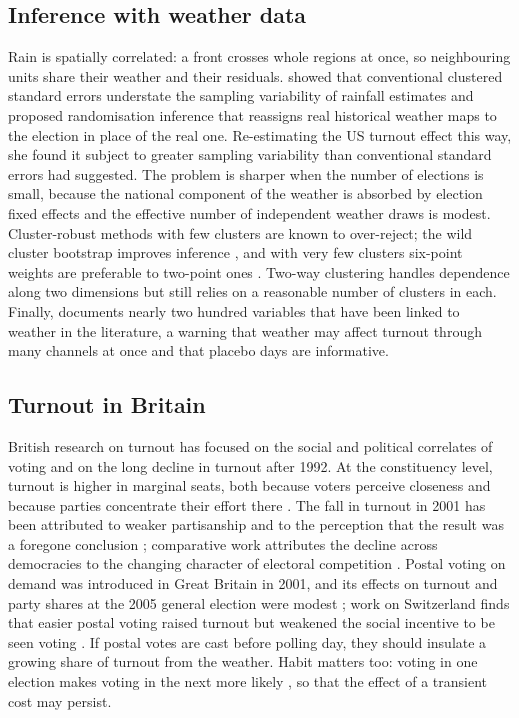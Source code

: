 \documentclass[11pt,a4paper]{article}
\begin{document}
\subsection{Inference with weather data}
Rain is spatially correlated: a front crosses whole regions at once, so neighbouring units share their weather and their residuals. \citet{cooperman2017} showed that conventional clustered standard errors understate the sampling variability of rainfall estimates and proposed randomisation inference that reassigns real historical weather maps to the election in place of the real one. Re-estimating the US turnout effect this way, she found it subject to greater sampling variability than conventional standard errors had suggested. The problem is sharper when the number of elections is small, because the national component of the weather is absorbed by election fixed effects and the effective number of independent weather draws is modest. Cluster-robust methods with few clusters are known to over-reject; the wild cluster bootstrap improves inference \citep{cameron2008}, and with very few clusters six-point weights are preferable to two-point ones \citep{webb2023}. Two-way clustering \citep{cameron2011} handles dependence along two dimensions but still relies on a reasonable number of clusters in each. Finally, \citet{mellon2025} documents nearly two hundred variables that have been linked to weather in the literature, a warning that weather may affect turnout through many channels at once and that placebo days are informative.

\subsection{Turnout in Britain}
British research on turnout has focused on the social and political correlates of voting and on the long decline in turnout after 1992. At the constituency level, turnout is higher in marginal seats, both because voters perceive closeness and because parties concentrate their effort there \citep{denverhands1974,denverhands1985}. The fall in turnout in 2001 has been attributed to weaker partisanship and to the perception that the result was a foregone conclusion \citep{heath2007}; comparative work attributes the decline across democracies to the changing character of electoral competition \citep{franklin2004}. Postal voting on demand was introduced in Great Britain in 2001, and its effects on turnout and party shares at the 2005 general election were modest \citep{ralling2010}; work on Switzerland finds that easier postal voting raised turnout \citep{hodler2015} but weakened the social incentive to be seen voting \citep{funk2010}. If postal votes are cast before polling day, they should insulate a growing share of turnout from the weather. Habit matters too: voting in one election makes voting in the next more likely \citep{gerber2003,fujiwara2016}, so that the effect of a transient cost may persist.
\end{document}
